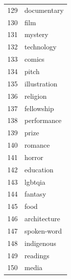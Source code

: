 \documentclass[]{report}   %
\begin{document}
\begin{figure}
\begin{minipage}[t]{0.24\textwidth}
\begin{tabular}{rl}
  129 & documentary \\ 
  130 & film \\ 
  131 & mystery \\ 
  132 & technology \\ 
  133 & comics \\ 
  134 & pitch \\ 
  135 & illustration \\ 
  136 & religion \\ 
  137 & fellowship \\ 
  138 & performance \\ 
  139 & prize \\ 
  140 & romance \\ 
  141 & horror \\ 
  142 & education \\ 
  143 & lgbtqia \\ 
  144 & fantasy \\ 
  145 & food \\ 
  146 & architecture \\ 
  147 & spoken-word \\ 
  148 & indigenous \\ 
  149 & readings \\ 
  150 & media \\ 
 \hline
\end{tabular}
    \end{minipage}
\begin{minipage}{0.24\textwidth}


\end{minipage}
\end{figure}
\end{document}
